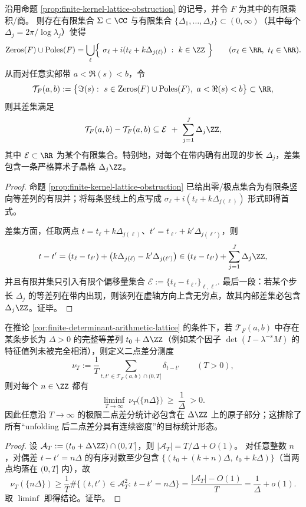 \begin{corollary}\label{cor:finite-determinant-arithmetic-lattice}
沿用命题 \ref{prop:finite-kernel-lattice-obstruction} 的记号，并令 \(F\) 为其中的有限乘积/商。
则存在有限集合 \(\Sigma\subset\CC\) 与有限集合 \(\{\Delta_1,\dots,\Delta_J\}\subset(0,\infty)\)（其中每个 \(\Delta_j=2\pi/\log\lambda_j\)）使得
\[
\mathrm{Zeros}(F)\cup\mathrm{Poles}(F)
=\bigcup_{\ell}\Bigl\{\ \sigma_\ell+i(t_\ell+k\Delta_{j(\ell)})\ :\ k\in\ZZ\ \Bigr\}
\qquad(\sigma_\ell\in\RR,\ t_\ell\in\RR).
\]
从而对任意实部带 \(a<\Re(s)<b\)，令
\[
\mathcal{T}_{F}(a,b)
:=\bigl\{\Im(s):\ s\in\mathrm{Zeros}(F)\cup\mathrm{Poles}(F),\ a<\Re(s)<b\bigr\}\subset\RR,
\]
则其差集满足
\[
\mathcal{T}_{F}(a,b)-\mathcal{T}_{F}(a,b)
\subseteq
\mathcal{E}\ +\ \sum_{j=1}^{J}\Delta_j\ZZ,
\]
其中 \(\mathcal{E}\subset\RR\) 为某个有限集合。特别地，对每个在带内确有出现的步长 \(\Delta_j\)，差集包含一条严格算术子晶格 \(\Delta_j\ZZ\)。
\end{corollary}
\begin{proof}
命题 \ref{prop:finite-kernel-lattice-obstruction} 已给出零/极点集合为有限条竖向等差列的有限并；将每条竖线上的点写成 \(\sigma_\ell+i(t_\ell+k\Delta_{j(\ell)})\) 形式即得首式。
\par
差集方面，任取两点 \(t=t_\ell+k\Delta_{j(\ell)}\)、\(t'=t_{\ell'}+k'\Delta_{j(\ell')}\)，则
\[
t-t'=(t_\ell-t_{\ell'})+\bigl(k\Delta_{j(\ell)}-k'\Delta_{j(\ell')}\bigr)\in (t_\ell-t_{\ell'})+\sum_{j=1}^J\Delta_j\ZZ,
\]
并且有限并集只引入有限个偏移量集合
\(
\mathcal{E}:=\{t_\ell-t_{\ell'}\}_{\ell,\ell'}.
\)
最后一段：若某个步长 \(\Delta_j\) 的等差列在带内出现，则该列在虚轴方向上含无穷点，故其内部差集必包含 \(\Delta_j\ZZ\)。证毕。
\end{proof}

\begin{corollary}\label{cor:finite-determinant-statistical-lattice}
在推论 \ref{cor:finite-determinant-arithmetic-lattice} 的条件下，若 \(\mathcal{T}_F(a,b)\) 中存在某条步长为 \(\Delta>0\) 的完整等差列 \(t_0+\Delta\ZZ\)（例如某个因子 \(\det(I-\lambda^{-s}M)\) 的特征值列未被完全相消），则定义二点差分测度
\[
\nu_T:=\frac{1}{T}\sum_{t,t'\in\mathcal{T}_F(a,b)\cap(0,T]}\delta_{t-t'}\qquad(T>0),
\]
则对每个 \(n\in\ZZ\) 都有
\[
\liminf_{T\to\infty}\ \nu_T\bigl(\{n\Delta\}\bigr)\ \ge\ \frac{1}{\Delta}\ >0.
\]
因此任意沿 \(T\to\infty\) 的极限二点差分统计必包含在 \(\Delta\ZZ\) 上的原子部分；这排除了所有“unfolding 后二点差分具有连续密度”的目标统计形态。
\end{corollary}
\begin{proof}
设 \(\mathcal{A}_T:=(t_0+\Delta\ZZ)\cap(0,T]\)，则 \(|\mathcal{A}_T|=T/\Delta+O(1)\)。
对任意整数 \(n\)，对偶差 \(t-t'=n\Delta\) 的有序对数至少包含 \(\{(t_0+(k+n)\Delta,\ t_0+k\Delta)\}\)（当两点均落在 \((0,T]\) 内），故
\[
\nu_T(\{n\Delta\})
\ge
\frac{1}{T}\#\bigl\{(t,t')\in\mathcal{A}_T^2:\ t-t'=n\Delta\bigr\}
=\frac{|\mathcal{A}_T|-O(1)}{T}
=\frac{1}{\Delta}+o(1).
\]
取 \(\liminf\) 即得结论。证毕。
\end{proof}

